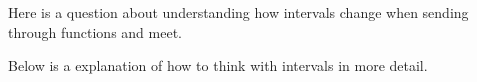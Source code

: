 \documentclass[twocolumn,a4paper]{article}
\begin{document}
Here is a question about understanding how intervals change when sending through functions and meet.

\begin{figure}[ht]
	\centering
	\vspace{-10pt}
	\vspace{-10pt}
\end{figure}

Below is a explanation of how to think with intervals in more detail.
\begin{figure}[ht]
	\centering
	\vspace{-10pt}
	\vspace{-30pt}
\end{figure}
\end{document}
